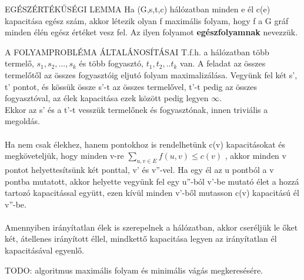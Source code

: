\begin{tetel}{EGÉSZÉRTÉKŰSÉGI LEMMA}
Ha (G,s,t,c) hálózatban minden e él c(e) kapacitása egész szám, akkor létezik olyan f maximális folyam, hogy f a G gráf minden élén egész értéket vesz fel. Az ilyen folyamot \textbf{egészfolyamnak} nevezzük.
\end{tetel}

\begin{tetel}{A FOLYAMPROBLÉMA ÁLTALÁNOSÍTÁSAI}
T.f.h. a hálózatban több termelő, $s_1, s_2,...,s_k$ és több fogyasztó, $t_1, t_2,..t_k$ van. A feladat az összes termelőtől az összes fogyasztóig eljutó folyam maximalizálása. Vegyünk fel két s', t' pontot, és kössük össze s'-t az összes termelővel, t'-t pedig az összes fogyasztóval, az élek kapacitása ezek között pedig legyen $\infty$.
\\
Ekkor az s' és a t'-t vesszük termelőnek és fogyasztónak, innen triviális a megoldás.
\\
\\
Ha nem csak élekhez, hanem pontokhoz is rendelhetünk c(v) kapacitásokat és megköveteljük, hogy minden v-re
$\sum_{u,v\in E}^{} f(u,v) \leq c(v)$
, akkor minden v pontot helyettesítsünk két ponttal, v' és v''-vel. Ha egy él az u pontból a v pontba mutatott, akkor helyette vegyünk fel egy u''-ból v'-be mutató élet a hozzá tartozó kapacitással együtt, ezen kívül minden v'-ből mutasson c(v) kapacitású él v''-be.
\\
\\
Amennyiben irányítatlan élek is szerepelnek a hálózatban, akkor cseréljük le őket két, átellenes irányított éllel, mindkettő kapacitása legyen az irányítatlan él kapacitásával egyenlő.
\end{tetel}

\large{TODO: algoritmus maximális folyam és minimális vágás megkeresésére.}